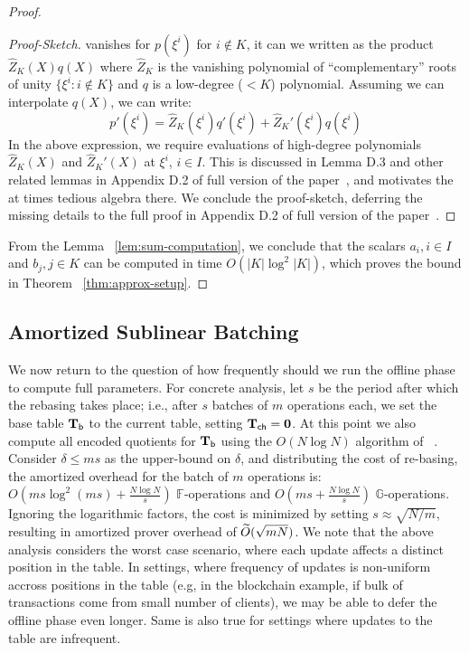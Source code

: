 \begin{proof}
\begin{proof}[Proof-Sketch]
        vanishes for $p(\xi^i)$ for $i\not\in K$, it can we written as the product $\widehat{Z}_K(X)q(X)$ where
        $\widehat{Z}_K$ is the vanishing polynomial of ``complementary'' roots of unity $\{\xi^i: i\not\in K\}$
        and $q$ is a low-degree ($<K$) polynomial. Assuming we can interpolate $q(X)$, we can write:
        \[ p'(\xi^i) = \widehat{Z}_K(\xi^i)q'(\xi^i) + \widehat{Z}_K'(\xi^i)q(\xi^i) \]
        In the above expression, we require evaluations of high-degree polynomials $\widehat{Z}_K(X)$ and $\widehat{Z}_K'(X)$
        at $\xi^i$, $i\in I$. This is discussed in Lemma D.3 and other related lemmas in Appendix D.2 of full version of the paper~\cite{full-ver},
        and motivates the at times tedious algebra there. We conclude the proof-sketch, deferring the missing details to the full
        proof in Appendix D.2 of full version of the paper~\cite{full-ver}.
    \end{proof}

    From the Lemma ~\ref{lem:sum-computation}, we conclude that the scalars $a_i,i\in I$ and $b_j, j\in K$ can be computed in
    time $O(|K|\log^2 |K|)$, which proves the bound in Theorem ~\ref{thm:approx-setup}.

\end{proof}

\subsection{Amortized Sublinear Batching}\label{sec:amortization}
We now return to the question of how frequently should we run the offline phase to compute full parameters.
For concrete analysis, let $s$ be the period after which the rebasing takes place; i.e., after $s$ batches of $m$ operations
each, we set the base table $\mathbf{T}_{\mathsf{b}}$ to the current table, setting $\mathbf{T}_{\mathsf{ch}}=\mathbf{0}$. At this point we also compute all
encoded quotients for $\mathbf{T}_{\mathsf{b}}$ using the $O(N\log N)$ algorithm of ~\cite{EPRINT:FeiKho23}. Consider $\delta\leq ms$ as
the upper-bound on $\delta$, and distributing the cost of re-basing, the amortized overhead for the batch of $m$ operations is:
$O(ms \log^2(ms)+\frac{N\log N}{s})$ $\mathbb{F}$-operations and $O(ms +\frac{N\log N}{s})$ $\mathbb{G}$-operations. Ignoring
the logarithmic factors, the cost is minimized by setting $s\approx \sqrt{N/m}$, resulting in amortized prover overhead of
$\widetilde{O}(\sqrt{mN})$. We note that the above analysis considers the worst case scenario, where each update affects a distinct
position in the table. In settings, where frequency of updates is non-uniform accross positions in the table (e.g, in the
blockchain example, if bulk of transactions come from small number of clients), we may be able to defer the offline phase even longer.
Same is also true for settings where updates to the table are infrequent.